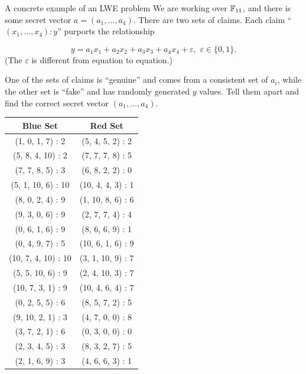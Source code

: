 \begin{example}{A concrete example of an LWE problem}{}
We are working over $\mathbb{F}_{11}$, and there is some secret vector
$a = ( a_{1},\ldots,a_{4} )$. There are two sets of claims.
Each claim ``$( x_{1},\ldots,x_{4} ):y$'' purports the
relationship

\[y = a_{1}x_{1} + a_{2}x_{2} + a_{3}x_{3} + a_{4}x_{4} + \varepsilon,\mspace{6mu}\varepsilon \in \{ 0,1 \}.\]
(The $\varepsilon$ is different from equation to equation.)

One of the sets of claims is ``genuine'' and comes from a consistent set
of $a_{i}$, while the other set is ``fake'' and has randomly generated
$y$ values. Tell them apart and find the correct secret vector
$( a_{1},\ldots,a_{4} )$.

\begin{center}
\begin{tabular}{|c|c|}
\hline
Blue Set & Red Set \\
\hline\hline
(1, 0, 1, 7) : 2 & (5, 4, 5, 2) : 2 \\
\hline
(5, 8, 4, 10) : 2 & (7, 7, 7, 8) : 5 \\
\hline
(7, 7, 8, 5) : 3 & (6, 8, 2, 2) : 0 \\
\hline
(5, 1, 10, 6) : 10 & (10, 4, 4, 3) : 1 \\
\hline
(8, 0, 2, 4) : 9 & (1, 10, 8, 6) : 6 \\
\hline
(9, 3, 0, 6) : 9 & (2, 7, 7, 4) : 4 \\
\hline
(0, 6, 1, 6) : 9 & (8, 6, 6, 9) : 1 \\
\hline
(0, 4, 9, 7) : 5 & (10, 6, 1, 6) : 9 \\
\hline
(10, 7, 4, 10) : 10 & (3, 1, 10, 9) : 7 \\
\hline
(5, 5, 10, 6) : 9 & (2, 4, 10, 3) : 7 \\
\hline
(10, 7, 3, 1) : 9 & (10, 4, 6, 4) : 7 \\
\hline
(0, 2, 5, 5) : 6 & (8, 5, 7, 2) : 5 \\
\hline
(9, 10, 2, 1) : 3 & (4, 7, 0, 0) : 8 \\
\hline
(3, 7, 2, 1) : 6 & (0, 3, 0, 0) : 0 \\
\hline
(2, 3, 4, 5) : 3 & (8, 3, 2, 7) : 5 \\
\hline
(2, 1, 6, 9) : 3 & (4, 6, 6, 3) : 1 \\
\hline
\end{tabular}
\end{center}
\end{example}

